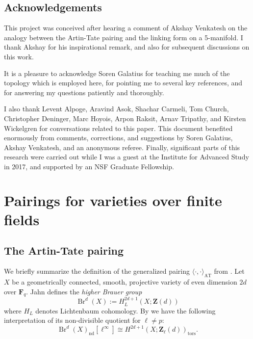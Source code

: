 \documentclass[10pt, reqno]{amsart}
\numberwithin{equation}{subsection}
\newcommand{\F}{\mathbf{F}}
\newcommand{\Z}{\mathbf{Z}}
\newcommand{\mrm}[1]{\mathrm{#1}}
\DeclareMathOperator{\et}{\acute{e}t}
\DeclareMathOperator{\Br}{Br}
\DeclareMathOperator{\nd}{nd}
\DeclareMathOperator{\tors}{tors}
\theoremstyle{remark}
\begin{document}
\subsection{Acknowledgements} This project was conceived after hearing a comment of Akshay Venkatesh on the analogy between the Artin-Tate pairing and the linking form on a 5-manifold. I thank Akshay for his inspirational remark, and also for subsequent discussions on this work. 

It is a pleasure to acknowledge Soren Galatius for teaching me much of the topology which is employed here, for pointing me to several key references, and for answering my questions patiently and thoroughly. 

I also thank Levent Alpoge, Aravind Asok, Shachar Carmeli, Tom Church, Christopher Deninger, Marc Hoyois, Arpon Raksit, Arnav Tripathy, and Kirsten Wickelgren for conversations related to this paper. This document benefited enormously from comments, corrections, and suggestions by Soren Galatius, Akshay Venkatesh, and an anonymous referee. Finally, significant parts of this research were carried out while I was a guest at the Institute for Advanced Study in 2017, and supported by an NSF Graduate Fellowship. 



\section{Pairings for varieties over finite fields}\label{sec: pairings}

\subsection{The Artin-Tate pairing}\label{subsec: Tate pairing}



 We briefly summarize the definition of the generalized pairing $\langle  \cdot, \cdot \rangle_{\mrm{AT}} $ from \cite[\S 2 and \S 3]{Jahn15}. Let $X$ be a geometrically connected, smooth, projective variety of even dimension $2d$ over $\F_q$. Jahn defines the \emph{higher Brauer group}
 \[
 \Br^d(X):= H_L^{2d+1}(X; \Z(d))
 \]
 where $H_L$ denotes Lichtenbaum cohomology. By \cite[Lemma 1]{Jahn15} we have the following interpretation of its non-divisible quotient for $\ell \neq p$:
 \[
 \Br^d(X)_{\nd}[\ell^{\infty}] \cong H_{\et}^{2d+1}(X; \Z_{\ell}(d))_{\tors}. 
 \]
 
\end{document}
